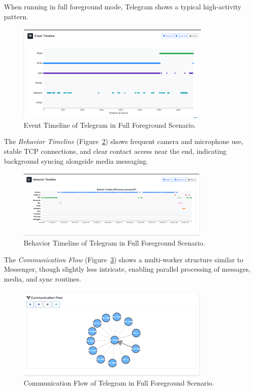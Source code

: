 \documentclass[a4paper,12pt]{report}
\begin{document}
When running in full foreground mode, Telegram shows a typical high-activity pattern.

\begin{figure}[H]
    \centering
    \includegraphics[width=0.85\textwidth]{telegram-full-events.png}
    \caption{Event Timeline of Telegram in Full Foreground Scenario.}
    \label{fig:telegram-full-events}
\end{figure}

The \textit{Behavior Timeline} (Figure~\ref{fig:telegram-full-behav}) shows frequent camera and microphone use, stable TCP connections, and clear contact access near the end, indicating background syncing alongside media messaging.

\begin{figure}[H]
    \centering
    \includegraphics[width=0.85\textwidth]{telegram-full-behav.png}
    \caption{Behavior Timeline of Telegram in Full Foreground Scenario.}
    \label{fig:telegram-full-behav}
\end{figure}

The \textit{Communication Flow} (Figure~\ref{fig:telegram-full-flow}) shows a multi-worker structure similar to Messenger, though slightly less intricate, enabling parallel processing of messages, media, and sync routines.

\begin{figure}[H]
    \centering
    \includegraphics[width=0.85\textwidth]{telegram-full-flow.png}
    \caption{Communication Flow of Telegram in Full Foreground Scenario.}
    \label{fig:telegram-full-flow}
\end{figure}
\end{document}
